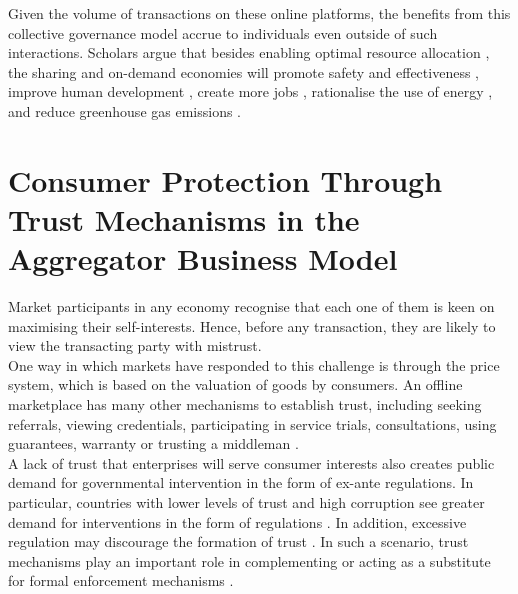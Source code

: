 \documentclass[a4paper, 12pt]{article}
\begin{document}
                  Given the volume of transactions on these online platforms, the benefits from this collective governance model accrue to individuals even outside of such interactions. Scholars argue that besides enabling optimal resource allocation \parencite{Hamari et al., 2015}, the sharing and on-demand economies will promote safety and effectiveness \parencite{Feeney et al. 2015; Lee et al. 2008}, improve human development \parencite{Hancock 2001}, create more jobs \parencite{Fang et al. 2015}, rationalise the use of energy \parencite{Kriston et al. 2010; Belk 2014; Martin et al. 2011; Rifkin 2015; Leismann et al. 2013}, and reduce greenhouse gas emissions \parencite{Martin et al. 2011; Costain et al. 2012; Steininger et al. 1996}.\\

                   
                    
                    \section{Consumer Protection Through Trust Mechanisms in the Aggregator Business Model}
                    
                    Market participants in any economy recognise that each one of them is keen on maximising their self-interests. Hence, before any transaction, they are likely to view the transacting party with mistrust.\\
                    
                    One way in which markets have responded to this challenge is through the price system, which is based on the valuation of goods by consumers. An offline marketplace has many other mechanisms to establish trust, including seeking referrals, viewing credentials, participating in service trials, consultations, using guarantees, warranty or trusting a middleman \parencite{thierer2015internet}.\\
                    
                  A lack of trust that enterprises will serve consumer interests also creates public demand for governmental intervention in the form of ex-ante regulations. In particular, countries with lower levels of trust and high corruption see greater demand for interventions in the form of regulations \parencite{aghionpaper}. In addition, excessive regulation may discourage the formation of trust \parencite{aghionpaper}. In such a scenario, trust mechanisms play an important role in complementing or acting as a substitute for formal enforcement mechanisms \parencite{thierer2015internet}. \\
                    
\end{document}
